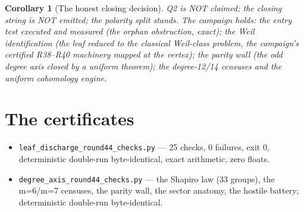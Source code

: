 \documentclass[11pt]{article}
\newtheorem{corollary}[theorem]{Corollary}
\begin{document}
\begin{corollary}[The honest closing decision]
Q2 is NOT claimed; the closing string is NOT emitted; the polarity split stands.  The campaign
holds: the entry test executed and measured (the orphan obstruction, exact); the Weil
identification (the leaf reduced to the classical Weil-class problem, the campaign's certified
R38--R40 machinery mapped at the vertex); the parity wall (the odd degree axis closed by a
uniform theorem); the degree-12/14 censuses and the uniform cohomology engine.
\end{corollary}

\section*{The certificates}

\begin{itemize}
\item \texttt{leaf\_discharge\_round44\_checks.py} --- 25 checks, 0 failures, exit 0,
deterministic double-run byte-identical, exact arithmetic, zero floats.
\item \texttt{degree\_axis\_round44\_checks.py} --- the Shapiro law (33 groups), the m=6/m=7
censuses, the parity wall, the sector anatomy, the hostile battery; deterministic double-run
byte-identical.
\end{itemize}
\end{document}
